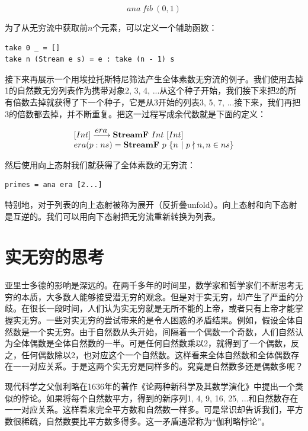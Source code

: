 \documentclass{article}
\begin{document}
\[
ana\ fib\ (0, 1)
\]

为了从无穷流中获取前$n$个元素，可以定义一个辅助函数：

\begin{lstlisting}
take 0 _ = []
take n (Stream e s) = e : take (n - 1) s
\end{lstlisting}

接下来再展示一个用埃拉托斯特尼筛法产生全体素数无穷流的例子。我们使用去掉1的自然数无穷列表作为携带对象2, 3, 4, ...从这个种子开始，我们接下来把2的所有倍数去掉就获得了下一个种子，它是从3开始的列表3, 5, 7, ...接下来，我们再把3的倍数都去掉，并不断重复。把这一过程写成余代数就是下面的定义：

\[
\begin{array}{l}
[Int] \arrowto{era} \mathbf{StreamF}\ Int\ [Int] \\
era (p:ns) = \mathbf{StreamF}\ p\ \{ n\ |\ p \nmid n, n \in ns\} \\
\end{array}
\]

然后使用向上态射我们就获得了全体素数的无穷流：

\begin{lstlisting}
primes = ana era [2...]
\end{lstlisting}

特别地，对于列表的向上态射被称为展开（反折叠unfold）。向上态射和向下态射是互逆的。我们可以用向下态射把无穷流重新转换为列表。

\begin{Exercise}
\end{Exercise}

\section{实无穷的思考}
亚里士多德的影响是深远的。在两千多年的时间里，数学家和哲学家们不断思考无穷的本质，大多数人能够接受潜无穷的观念。但是对于实无穷，却产生了严重的分歧。在很长一段时间，人们认为实无穷就是无所不能的上帝，或者只有上帝才能掌握实无穷。一些对实无穷的尝试带来的是令人困惑的矛盾结果。例如，假设全体自然数是一个实无穷。由于自然数从头开始，间隔着一个偶数一个奇数，人们自然认为全体偶数是全体自然数的一半。可是任何自然数乘以2，就得到了一个偶数，反之，任何偶数除以2，也对应这个一个自然数。这样看来全体自然数和全体偶数存在一一对应关系。于是这两个实无穷是同样多的。究竟是自然数多还是偶数多呢？

现代科学之父伽利略在1636年的著作《论两种新科学及其数学演化》中提出一个类似的悖论。如果将每个自然数平方，得到的新序列1, 4, 9, 16, 25, ...和自然数存在一一对应关系。这样看来完全平方数和自然数一样多。可是常识却告诉我们，平方数很稀疏，自然数要比平方数多得多。这一矛盾通常称为“伽利略悖论”。
\end{document}
